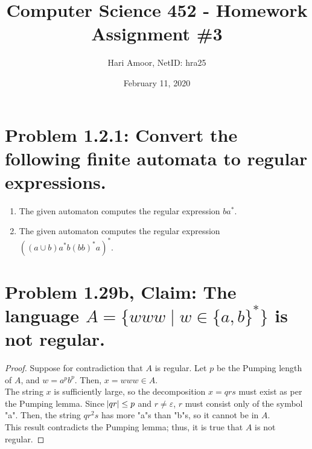 \documentclass[12pt]{article}
\title{Computer Science 452 - Homework Assignment \#3}
\author{Hari Amoor, NetID: hra25}
\date{February 11, 2020}
\begin{document}
\maketitle

\section*{Problem 1.2.1: Convert the following finite automata to regular expressions.}
\begin{enumerate}[label=(\alph*)]
	\item The given automaton computes the regular expression $ba^{*}$.
	\item The given automaton computes the regular expression $((a \cup b)a^{*}b(bb)^{*}a)^{*}$.
\end{enumerate}

\section*{Problem 1.29b, Claim: The language $A = \{www \mid w \in \{a, b\}^{*}\}$ is not regular.}
\begin{proof}
	Suppose for contradiction that $A$ is regular. Let $p$ be the Pumping length of $A$, and $w = a^{p}b^{p}$. Then, $x = www \in A$. \\
	\newline
	The string $x$ is sufficiently large, so the decomposition $x = qrs$ must exist as per the Pumping lemma. Since $\abs{qr} \leq p$ and $r \neq \varepsilon$, $r$ must consist only of the symbol "a". Then, the string $qr^{2}s$ has more "a"s than "b"s, so it cannot be in $A$. \\
	\newline
	This result contradicts the Pumping lemma; thus, it is true that $A$ is not regular.
\end{proof}
\end{document}

